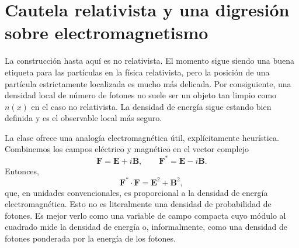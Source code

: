 \section{Cautela relativista y una digresión sobre electromagnetismo}

La construcción hasta aquí es no relativista. El momento sigue siendo una buena etiqueta para las partículas en la física relativista, pero la posición de una partícula estrictamente localizada es mucho más delicada. Por consiguiente, una densidad local de número de fotones no suele ser un objeto tan limpio como \(n(x)\) en el caso no relativista. La densidad de energía sigue estando bien definida y es el observable local más seguro.

La clase ofrece una analogía electromagnética útil, explícitamente heurística. Combinemos los campos eléctrico y magnético en el vector complejo
\begin{equation}
\mathbf F=\mathbf E+i\mathbf B,
\qquad
\mathbf F^*=\mathbf E-i\mathbf B.
\label{eq:l07-riemann-silberstein}
\end{equation}
Entonces,
\begin{equation}
\mathbf F^*\mathbin{\cdot}\mathbf F
=\mathbf E^2+\mathbf B^2,
\label{eq:l07-em-density}
\end{equation}
que, en unidades convencionales, es proporcional a la densidad de energía electromagnética. Esto no es literalmente una densidad de probabilidad de fotones. Es mejor verlo como una variable de campo compacta cuyo módulo al cuadrado mide la densidad de energía o, informalmente, como una densidad de fotones ponderada por la energía de los fotones.

\begin{classroomqa}
\end{classroomqa}

\begin{classroomqa}
\end{classroomqa}

